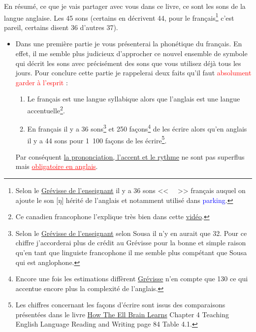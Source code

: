 \documentclass[12pt,a4paper]{book}
\newcommand{\exEN}[1]{%
  \textcolor{blue}{\textenglish{#1}}}
\newcommand{\exFR}[1]{%
  \textcolor{olive}{\textcursive{#1}}}
\begin{document}
En résumé, ce que je vais partager avec vous dans ce livre, ce
sont les sons de la langue anglaise. Les 45 sons (certains en
décrivent 44, pour le français\footnote{Selon le
  \href{https://www.amazon.fr/gp/product/221010632X/ref=as_li_tl?ie=UTF8&camp=1642&creative=6746&creativeASIN=221010632X&linkCode=as2&tag=wwwbecomefree-21&linkId=c8c522ee07ffc9188dd9a768e39d88e0}{Grévisse
  de l'enseignant} il y a 36 sons <<~\exFR{purement}~>> français
auquel on ajoute le son [ŋ] hérité de l'anglais et notamment utilisé dans \exEN{parking}.} c'est pareil, certains disent 36
d'autres 37).\par
\begin{itemize}
\item Dans une première partie je vous présenterai la phonétique du
français. En effet, il me semble plus judicieux d'approcher ce nouvel
ensemble de symbole qui décrit les sons avec précisément des sons que
vous utilisez déjà tous les jours.  Pour conclure cette partie je
rappelerai deux faits qu'il faut \textcolor{red}{absolument garder à l'esprit} :
\begin{enumerate}
\item Le français est une langue syllabique alors que l'anglais est
  une langue accentuelle\footnote{Ce canadien francophone l'explique
    très bien dans cette
    \href{https://youtu.be/EjVHGsRCf8M?t=4m45s}{vidéo}.}.
\item En français il y a 36 sons\footnote{Selon le
  \href{https://www.amazon.fr/gp/product/221010632X/ref=as_li_tl?ie=UTF8&camp=1642&creative=6746&creativeASIN=221010632X&linkCode=as2&tag=wwwbecomefree-21&linkId=c8c522ee07ffc9188dd9a768e39d88e0}{Grévisse
  de l'enseignant} selon Sousa il n'y en aurait que 32. Pour ce
chiffre j'accorderai plus de crédit au Grévisse pour la bonne et
simple raison qu'en tant que linguiste francophone il me semble plus
compétant que Sousa qui est anglophone.} et 250 façons\footnote{Encore une
fois les estimations diffèrent
\href{https://www.amazon.fr/gp/product/221010632X/ref=as_li_tl?ie=UTF8&camp=1642&creative=6746&creativeASIN=221010632X&linkCode=as2&tag=wwwbecomefree-21&linkId=c8c522ee07ffc9188dd9a768e39d88e0}{Grévisse}
n'en compte que 130 ce qui accentue encore plus la complexité de l'anglais.} de les écrire alors
  qu'en anglais il y a 44 sons pour 1~100 façons de les
  écrire\footnote{Les chiffres concernant les façons d'écrire sont
    issus des comparaisons présentées dans le livre
    \href{https://www.amazon.fr/gp/product/B00M0GDXN8/ref=as_li_tl?ie=UTF8&camp=1642&creative=6746&creativeASIN=B00M0GDXN8&linkCode=as2&tag=wwwbecomefree-21&linkId=e782cf430858413ec9135fcef1644b20}{How
      The Ell Brain Learns} Chapter 4 Teaching English Language
    Reading and Writing page 84 Table 4.1.}.
\end{enumerate}
Par conséquent \underline{la prononciation, l'accent et le rythme} ne sont pas
superflus mais \textcolor{red}{\underline{obligatoire en anglais}}.\par


\end{itemize}
\end{document}
